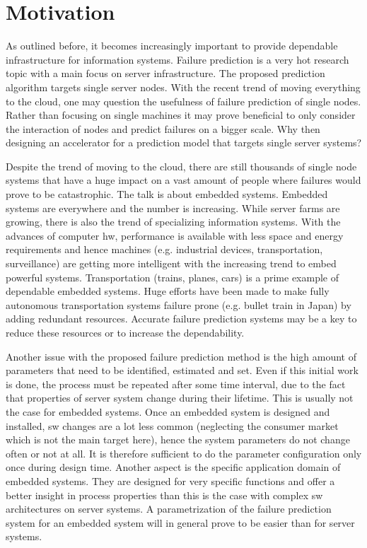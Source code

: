 \documentclass[mscthesis]{usiinfthesis}
\begin{document}
\section{Motivation}
\label{ch:intro_mot}

As outlined before, it becomes increasingly important to provide dependable
infrastructure for information systems. Failure prediction is a very hot
research topic with a main focus on server infrastructure. The proposed
prediction algorithm targets single server nodes. With the recent trend of
moving everything to the cloud, one may question the usefulness of failure
prediction of single nodes. Rather than focusing on single machines it may
prove beneficial to only consider the interaction of nodes and predict failures
on a bigger scale. Why then designing an accelerator for a prediction model
that targets single server systems?

Despite the trend of moving to the cloud, there are still thousands of single
node systems that have a huge impact on a vast amount of people where failures
would prove to be catastrophic. The talk is about embedded systems. Embedded
systems are everywhere and the number is increasing. While server farms are
growing, there is also the trend of specializing information systems. With the
advances of computer \gls{hw}, performance is available with less space and
energy requirements and hence machines (e.g. industrial devices,
transportation, surveillance) are getting more intelligent with the increasing
trend to embed powerful systems. Transportation (trains, planes, cars) is
a prime example of dependable embedded systems. Huge efforts have been made to
make fully autonomous transportation systems failure prone (e.g. bullet train
in Japan) by adding redundant resources. Accurate failure prediction systems
may be a key to reduce these resources or to increase the dependability.

Another issue with the proposed failure prediction method is the high amount of
parameters that need to be identified, estimated and set. Even if this initial
work is done, the process must be repeated after some time interval, due to the
fact that properties of server system change during their lifetime. This is
usually not the case for embedded systems. Once an embedded system is designed
and installed, \gls{sw} changes are a lot less common (neglecting the consumer
market which is not the main target here), hence the system parameters do not
change often or not at all. It is therefore sufficient to do the parameter
configuration only once during design time. Another aspect is the specific
application domain of embedded systems. They are designed for very specific
functions and offer a better insight in process properties than this is the
case with complex \gls{sw} architectures on server systems. A parametrization
of the failure prediction system for an embedded system will in general prove
to be easier than for server systems.
\end{document}
